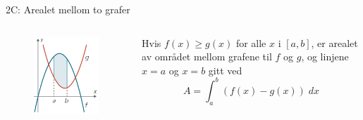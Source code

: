 \redheader
\begin{frame}{2C: Arealet mellom to grafer}
    \begin{columns}
        \begin{column}{0.3\linewidth}
            \begin{figure}
                \centering
                \includegraphics[width=\linewidth]{R2-K2B-12.png}
            \end{figure}
        \end{column}
        \begin{column}{0.6\linewidth}
            Hvis \(f(x)\geq g(x)\) for alle \(x\) i \([a,b]\), er arealet av området mellom grafene til \(f\) og \(g\), og linjene \(x=a\) og \(x=b\) gitt ved
            \begin{equation*}
                A = \int_a^b (f(x) - g(x)) \;dx
            \end{equation*}
        \end{column}
    \end{columns}
\end{frame}

